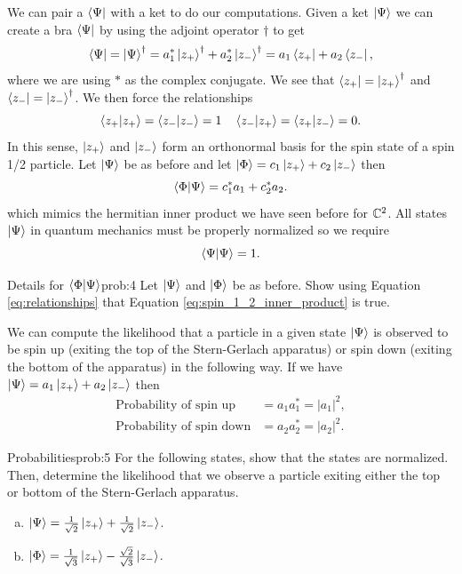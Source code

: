 \documentclass{article}
\begin{document}
We can pair a  $\bra{\Psi}$ with a ket to do our computations. Given a ket $\ket{\Psi}$ we can create a bra $\bra{\Psi}$ by using the adjoint operator $\dagger$ to get
\[
\bra{\Psi} = \ket{\Psi}^\dagger = a_1^* \ket{z_+}^\dagger + a_2^* \ket{z_-}^\dagger = a_1 \bra{z_+} + a_2 \bra{z_-},
\] 
where we are using $*$ as the complex conjugate. We see that $\bra{z_+}=\ket{z_+}^\dagger$ and $\bra{z_-}=\ket{z_-}^\dagger$.  We then force the relationships
\begin{equation}
\label{eq:relationships}
\bra{z_+} \ket{z_+} = \bra{z_-}\ket{z_-} = 1 \quad \bra{z_-}\ket{z_+} = \bra{z_+}\ket{z_-} = 0.
\end{equation}
In this sense, $\ket{z_+}$ and $\ket{z_-}$ form an orthonormal basis for the spin state of a spin 1/2 particle. Let $\ket{\Psi}$ be as before and let $\ket{\Phi} = c_1 \ket{z_+} + c_2 \ket{z_-}$ then 
\begin{equation}
\label{eq:spin_1_2_inner_product}
\bra{\Phi}\ket{\Psi} = c_1^* a_1 + c_2^* a_2.
\end{equation}
which mimics the hermitian inner product we have seen before for $\mathbb{C}^2$. All states $\ket{\Psi}$ in quantum mechanics must be properly normalized so we require
\[
\bra{\Psi}\ket{\Psi} = 1.
\]

\begin{problem}{Details for $\bra{\Phi}\ket{\Psi}$}{prob:4}
    Let $\ket{\Psi}$ and $\ket{\Phi}$ be as before. Show using Equation \ref{eq:relationships} that Equation \ref{eq:spin_1_2_inner_product} is true.
\end{problem}

We can compute the likelihood that a particle in a given state $\ket{\Psi}$ is observed to be spin up (exiting the top of the Stern-Gerlach apparatus) or spin down (exiting the bottom of the apparatus) in the following way. If we have $\ket{\Psi}=a_1 \ket{z_+} + a_2 \ket{z_-}$ then 
\begin{align}
    \textrm{Probability of spin up} &= a_1 a_1^* = |a_1|^2,\\
    \textrm{Probability of spin down} &= a_2 a_2^* = |a_2|^2.
\end{align}

\begin{problem}{Probabilities}{prob:5}
    For the following states, show that the states are normalized. Then, determine the likelihood that we observe a particle exiting either the top or bottom of the Stern-Gerlach apparatus.
    \begin{enumerate}[(a)]
        \item $\ket{\Psi} = \frac{1}{\sqrt{2}} \ket{z_+} + \frac{1}{\sqrt{2}} \ket{z_-}$.
        \item $\ket{\Phi} = \frac{1}{\sqrt{3}} \ket{z_+} - \frac{\sqrt{2}}{\sqrt{3}} \ket{z_-}$.
    \end{enumerate}
\end{problem}
\end{document}
